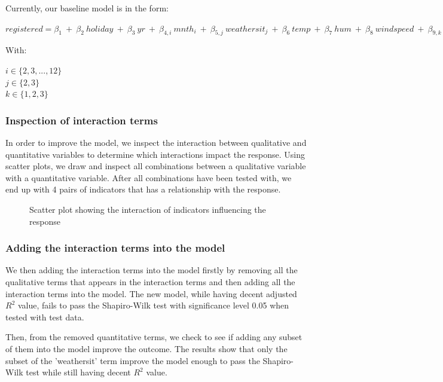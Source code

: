 Currently, our baseline model is in the form:

\begin{center}
    $registered = \beta_1 \ + \ \beta_2 \ holiday \ + \ \beta_3 \ yr \ + \ \beta_{4,i} \ mnth_i \ + \ \beta_{5,j} \ weathersit_j \ + \ \beta_6 \ temp \ + \ \beta_7 \ hum \ + \ \beta_8 \ windspeed \ + \ \beta_{9,k} \ season_k$
\end{center}

With:

\begin{center}
    $i \in \{2,3,...,12\}$
    \\
    $j \in \{2,3\}$
    \\
    $k \in \{1,2,3\}$
\end{center}

\subsubsection{Inspection of interaction terms}
In order to improve the model, we inspect the interaction between qualitative and quantitative variables to determine which interactions impact the response. Using scatter plots, we draw and inspect all combinations between a qualitative variable with a quantitative variable. After all combinations have been tested with, we end up with 4 pairs of indicators that has a relationship with the response.  

\begin{figure}[H]
\centering
\caption{Scatter plot showing the interaction of indicators influencing the response}
\label{fig:scattplot_with 4}
\end{figure}
\subsubsection{Adding the interaction terms into the model}
We then adding the interaction terms into the model firstly by removing all the qualitative terms that appears in the interaction terms and then adding all the interaction terms into the model. The new model, while having decent adjusted $R^2$ value, fails to pass the Shapiro-Wilk test with significance level 0.05 when tested with test data.

Then, from the removed quantitative terms, we check to see if adding any subset of them into the model improve the outcome. The results show that only the subset of the 'weathersit' term improve the model enough to pass the Shapiro-Wilk test while still having decent $R^2$ value. 

